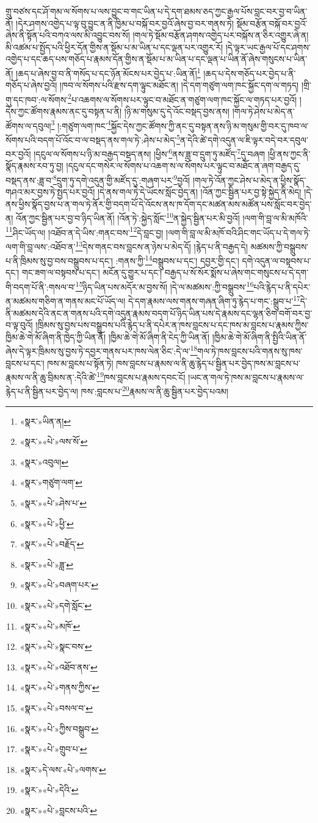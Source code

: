 གྲུ་བཙས་དང་ཤོ་གམ་ལ་སོགས་པ་ལས་བྱུང་བ་གང་ཡིན་པ་དེ་དག་ཐམས་ཅད་ཀྱང་རྒྱལ་པོས་བླང་བར་བྱ་བ་ཡིན་ནོ། །དེར་ཤགས་འགྱེད་པ་ལྟ་བུ་བྱུང་ན་ནི་ཁྱིམ་པ་བསྐོ་བར་བྱའོ་ཞེས་བྱ་བར་གནས་ཏེ། སྡོམ་བརྩོན་བསྐོ་བར་བྱའོ་ཞེས་ནི་སྟོན་པའི་བཀའ་ལས་མི་འབྱུང་བས་སོ། །གལ་ཏེ་སྡོམ་བརྩོན་ཤགས་འགྱེད་པར་བསྐོས་ན་ཅིར་འགྱུར་ཞེ་ན། མི་འཚམ་པ་སྤྱོད་པའི་ཕྱིར་དོན་གྱིས་ན་སྡོམ་པ་མ་ཡིན་པ་དང་ལྡན་པར་འགྱུར་རོ། །དེ་ལྟར་ཡང་རྒྱལ་པོ་དང་ཤགས་འགྱེད་པ་དང་ཆད་པས་གཅོད་པ་རྣམས་དོན་གྱིས་ན་སྡོམ་པ་མ་ཡིན་པ་དང་ལྡན་པ་ཡིན་ནོ་ཞེས་གསུངས་པ་ཡིན་ནོ། །ཆད་པ་ཞེས་བྱ་བ་ནི་གསོད་པ་དང་ཉོན་མོངས་པར་བྱེད་པ་:ཡིན་ནོ།\footnote{«སྣར་»ཡིན་ན།} །ཆད་པ་དེས་གཅོད་པར་བྱེད་པ་ནི་གཅོད་པ་ཞེས་བྱའོ། །ཁབ་ལ་སོགས་པའི་རྫས་དག་ལྟུང་མཐོང་ན། །དེ་དག་གཙུག་ལག་ཁང་སྐྱོང་དག་ལ་གཏད། །གྲི་གུ་དང་ཁབ་:ལ་སོགས་\footnote{«སྣར་»«པེ་»ལས་སོ་}པ་འཆགས་ལ་སོགས་པར་ལྟུང་བ་མཐོང་ན་གཙུག་ལག་ཁང་སྐྱོང་ལ་གཏད་པར་བྱའོ། །དེས་ཀྱང་ཚོགས་རྣམས་ནང་དུ་བསྟན་པ་ནི། །ཉི་མ་གསུམ་དུ་དེ་འོང་བསྡད་བྱས་ནས། །གལ་ཏེ་ཤེས་པ་མེད་ན་ཚོགས་ལ་དབུལ།\footnote{«སྣར་»འབུལ།} །:གཙུག་ལག་ཁང་\footnote{«སྣར་»གཙུག་ལག་}སྐྱོང་དེས་ཀྱང་ཚོགས་ཀྱི་ནང་དུ་བསྟན་ནས་ཉི་མ་གསུམ་གྱི་བར་དུ་ཁབ་ལ་སོགས་པའི་བདག་པོ་འོང་བ་ལ་བསྡད་ནས་གལ་ཏེ་:ཤེས་པ་མེད་\footnote{«སྣར་»«པེ་»ཤེས་པ་}ན་དེའི་ཚེ་དགེ་འདུན་ལ་ཇི་ལྟར་བདེ་བར་དབུལ་བར་བྱའོ། །དངུལ་ལ་སོགས་པ་ཉི་མ་བརྒྱད་བསྡད་ནས། །ཕྱིས་\footnote{«སྣར་»«པེ་»ཕྱི་}ནས་ཟླ་བ་དྲུག་ཏུ་མཛོད་\footnote{«སྣར་»«པེ་»བརྗོད་}དུ་བཞག །ཕྱི་ནས་ཀྱང་ནི་སྣོད་རྣམས་རབ་ཏུ་བྱ། །དངུལ་དང་གསེར་ལ་སོགས་པ་འཆག་ས་ལ་སོགས་པར་ལྟུང་བ་མཐོང་ན་ཞག་བརྒྱད་དུ་བསྡད་ནས་:ཟླ་བ་\footnote{«སྣར་»«པེ་»ཟླ་}དྲུག་ཏུ་དགེ་འདུན་གྱི་མཛོད་དུ་:གཞག་པར་\footnote{«སྣར་»«པེ་»བཞག་པར་}བྱའོ། །གལ་ཏེ་འོན་ཀྱང་ཤེས་པ་མེད་ན་ཕྱིས་སྣོད་གཤའ་མར་བྱས་ཏེ་སྤྱད་པར་བྱའོ། །དེ་ནས་གལ་ཏེ་དེ་ཡོངས་སློང་བྱེད་ན། །འོན་ཀྱང་སྦྱིན་པར་བྱ་སྟེ་སྐྱེད་ནི་མེད། །དེ་ནས་ཕྱིས་སྣོད་བྱས་པ་ན་གལ་ཏེ་ནོར་གྱི་བདག་པོ་དེ་འོངས་ནས་ཁ་དོག་དང་མཚན་མས་མཚོན་པས་སློང་བར་བྱེད་ན། འོན་ཀྱང་སྦྱིན་པར་བྱ་བ་ཉིད་ཡིན་ནོ། །འོན་ཏེ་:སྐྱེད་སློང་\footnote{«སྣར་»«པེ་»དགེ་སློང་}ན་སྐྱེད་སྦྱིན་པར་མི་བྱའོ། །ལག་གི་བླ་ལ་མི་མཁོའི་\footnote{«སྣར་»«པེ་»མཁོ་}ཤིང་ཡོད་ལ། །འཐོབ་ན་དེ་ཡིས་:གནང་བས་\footnote{«སྣར་»«པེ་»སྣང་བས་}དེ་བླང་བྱ། །ལག་གི་བླ་ལ་མི་མཁོ་བའི་ཤིང་གང་ཡོད་པ་དེ་གལ་ཏེ་ལག་གི་བླ་ལས་:འཐོབ་ན་\footnote{«སྣར་»«པེ་»འཐོབ་ནས་}དེས་གནང་བས་བླངས་ན་ཉེས་པ་མེད་དོ། །རྙེད་པ་ནི་བརྒྱད་དེ། མཚམས་ཀྱི་བསྒྲུབས་པ་ནི་ཁྲིམས་སུ་བྱ་བས་བསྒྲུབས་པ་དང་། :གནས་ཀྱི་\footnote{«སྣར་»«པེ་»གནས་ཀྱིས་}བསྒྲུབས་པ་དང་། དབྱར་གྱི་དང་། དགེ་འདུན་ལ་བསྟབས་པ་དང་། གང་ཟག་ལ་བསྟབས་པ་དང་། མངོན་དུ་གྱུར་པ་དང་། བརྒྱད་པ་སོ་སོར་སྨོས་པ་ཞེས་གང་གསུངས་པ་དེ་དག་གི་བདག་པོ་ནི་:གསལ་བ་\footnote{«སྣར་»«པེ་»བསལ་བ་}ཉིད་ཡིན་པས་མདོར་མ་བྱས་སོ། །དེ་ལ་མཚམས་:ཀྱི་བསྒྲུབས་\footnote{«སྣར་»«པེ་»ཀྱིས་བསྒྲུབ་}པའི་རྙེད་པ་ནི་དཔེར་ན་མཚམས་གཅིག་ན་གནས་མང་པོ་ཡོད་ལ། དེ་དག་རྣམས་ལས་གནས་གཞན་ཞིག་ཏུ་རྙེད་པ་གང་:སྒྲུབ་པ་\footnote{«སྣར་»«པེ་»གྲུབ་པ་}དེ་ནི་མཚམས་དེའི་ནང་ན་གནས་པའི་དགེ་འདུན་རྣམས་བདག་པོ་ཉིད་ཡིན་པས་དེ་རྣམས་དང་ལྷན་ཅིག་བགོ་བར་བྱ་བ་ལྟ་བུའོ། །ཁྲིམས་སུ་བྱས་པས་བསྒྲུབས་པའི་རྙེད་པ་ནི་དཔེར་ན་ཁས་བླངས་པ་དང་ཁས་མ་བླངས་པ་རྣམས་ཀྱིས་ཁྱིམ་ཆེ་གེ་མོ་ཞིག་ནི་ཁྱེད་ཀྱི་ཡིན་ནོ། །ཁྱིམ་ཆེ་གེ་མོ་ཞིག་ནི་ངེད་ཀྱི་ཡིན་ནོ། །ཁྱིམ་ཆེ་གེ་མོ་ཞིག་ནི་སྤྱིའི་ཡིན་ནོ་ཞེས་དེ་ལྟར་ཁྲིམས་སུ་བྱས་ཏེ་དབྱར་གནས་པར་ཁས་ལེན་ཅིང་:དེ་ལ་\footnote{«སྣར་»དེ་ལས་«པེ་»ལགས་}གལ་ཏེ་ཁས་བླངས་པའི་གནས་སུ་ཁས་བླངས་པ་དང་། ཁས་མ་བླངས་པ་སྟོན་ཏེ། ཁས་བླངས་པ་རྣམས་ལ་ནི་ཆུ་རྙེད་པ་སྦྱིན་པར་བྱེད་ཁས་མ་བླངས་པ་རྣམས་ལ་ནི་ཆུ་བྲིམས་ན་:དེའི་ཚེ་\footnote{«སྣར་»«པེ་»དེའི་}ཁས་བླངས་པ་རྣམས་དབང་ངོ། །ཡང་ན་གལ་ཏེ་ཁས་མ་བླངས་པ་རྣམས་ལ་རྙེད་པ་ནི་སྦྱིན་པར་བྱེད་ལ། ཁས་:བླངས་པ་\footnote{«སྣར་»«པེ་»བླངས་པའི་}རྣམས་ལ་ནི་ཆུ་སྦྱིན་པར་བྱེད་པའམ། 